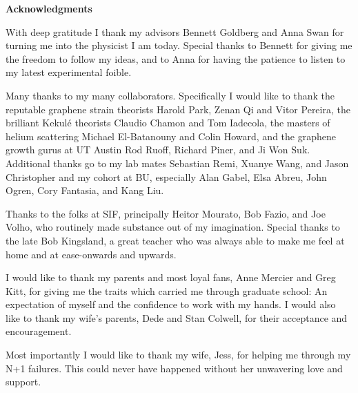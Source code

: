 \begin{center}
\textbf{Acknowledgments} 
\end{center}
With deep gratitude I thank my advisors Bennett Goldberg and Anna Swan for turning me into the physicist I am today.
Special thanks to Bennett for giving me the freedom to follow my ideas, and to Anna for having the patience to listen to my latest experimental foible.

Many thanks to my many collaborators.
Specifically I would like to thank the reputable graphene strain theorists Harold Park, Zenan Qi and Vitor Pereira, the brilliant Kekul\'e theorists Claudio Chamon and Tom Iadecola, the masters of helium scattering Michael El-Batanouny and Colin Howard, and the graphene growth gurus at UT Austin Rod Ruoff, Richard Piner, and Ji Won Suk.
Additional thanks go to my lab mates Sebastian Remi, Xuanye Wang, and Jason Christopher and my cohort at BU, especially Alan Gabel, Elsa Abreu, John Ogren, Cory Fantasia, and Kang Liu.

Thanks to the folks at SIF, principally Heitor Mourato, Bob Fazio, and Joe Volho, who routinely made substance out of my imagination.
Special thanks to the late Bob Kingsland, a great teacher who was always able to make me feel at home and at ease-onwards and upwards.

I would like to thank my parents and most loyal fans, Anne Mercier and Greg Kitt, for giving me the traits which carried me through graduate school: An expectation of myself and the confidence to work with my hands.
I would also like to thank my wife's parents, Dede and Stan Colwell, for their acceptance and encouragement.

Most importantly I would like to thank my wife, Jess, for helping me through my N+1 failures.
This could never have happened without her unwavering love and support.

\newpage